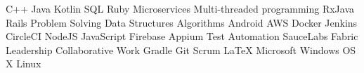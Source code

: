 
\begin{cvparagraph}

C++{\dotsep}
Java{\dotsep}
Kotlin{\dotsep}
SQL{\dotsep}
Ruby{\dotsep}
Microservices{\dotsep}
Multi-threaded programming{\dotsep}
RxJava{\dotsep}
Rails{\dotsep}
Problem Solving{\dotsep}
Data Structures{\dotsep}
Algorithms{\dotsep}
Android{\dotsep}
AWS{\dotsep}
Docker{\dotsep}
Jenkins{\dotsep}
CircleCI{\dotsep}
NodeJS{\dotsep}
JavaScript{\dotsep}
Firebase{\dotsep}
Appium{\dotsep}
Test Automation{\dotsep}
SauceLabs{\dotsep}
Fabric{\dotsep}
Leadership{\dotsep}
Collaborative Work{\dotsep}
Gradle{\dotsep}
Git{\dotsep}
Scrum{\dotsep}
\LaTeX{\dotsep}
Microsoft Windows{\dotsep}
OS X{\dotsep}
Linux

\end{cvparagraph}
